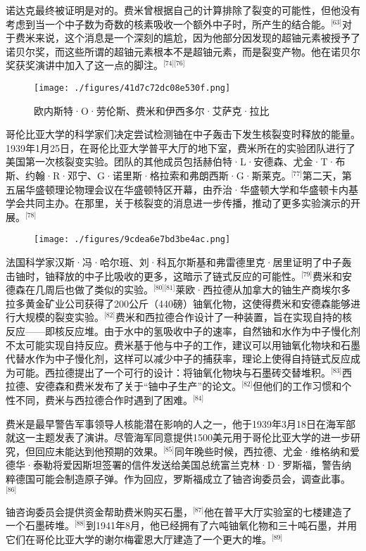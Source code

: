 诺达克最终被证明是对的。费米曾根据自己的计算排除了裂变的可能性，但他没有考虑到当一个中子数为奇数的核素吸收一个额外中子时，所产生的结合能。\(^\text{[63]}\)对于费米来说，这个消息是一个深刻的尴尬，因为他部分因发现的超铀元素被授予了诺贝尔奖，而这些所谓的超铀元素根本不是超铀元素，而是裂变产物。他在诺贝尔奖获奖演讲中加入了这一点的脚注。\(^\text{[74][76]}\)
\begin{figure}[ht]
\centering
\texttt{[image: ./figures/41d7c72dc08e530f.png]}
\caption{欧内斯特·O·劳伦斯、费米和伊西多尔·艾萨克·拉比} \label{fig_ELK_9}
\end{figure}
哥伦比亚大学的科学家们决定尝试检测铀在中子轰击下发生核裂变时释放的能量。1939年1月25日，在哥伦比亚大学普平大厅的地下室，费米所在的实验团队进行了美国第一次核裂变实验。团队的其他成员包括赫伯特·L·安德森、尤金·T·布斯、约翰·R·邓宁、G·诺里斯·格拉索和弗朗西斯·G·斯莱克。\(^\text{[77]}\)第二天，第五届华盛顿理论物理会议在华盛顿特区开幕，由乔治·华盛顿大学和华盛顿卡内基学会共同主办。在那里，关于核裂变的消息进一步传播，推动了更多实验演示的开展。\(^\text{[78]}\)
\begin{figure}[ht]
\centering
\texttt{[image: ./figures/9cdea6e7bd3be4ac.png]}
\caption{} \label{fig_ELK_10}
\end{figure}
法国科学家汉斯·冯·哈尔班、刘·科瓦尔斯基和弗雷德里克·居里证明了中子轰击铀时，铀释放的中子比吸收的更多，这暗示了链式反应的可能性。\(^\text{[79]}\)费米和安德森在几周后也做了类似的实验。\(^\text{[80][81]}\)莱欧·西拉德从加拿大的铀生产商埃尔多拉多黄金矿业公司获得了200公斤（440磅）铀氧化物，这使得费米和安德森能够进行大规模的裂变实验。\(^\text{[82]}\)费米和西拉德合作设计了一种装置，旨在实现自持的核反应——即核反应堆。由于水中的氢吸收中子的速率，自然铀和水作为中子慢化剂不太可能实现自持反应。费米基于他与中子的工作，建议可以用铀氧化物块和石墨代替水作为中子慢化剂，这样可以减少中子的捕获率，理论上使得自持链式反应成为可能。西拉德提出了一个可行的设计：将铀氧化物块与石墨砖交替堆积。\(^\text{[83]}\)西拉德、安德森和费米发布了关于“铀中子生产”的论文。\(^\text{[82]}\)但他们的工作习惯和个性不同，费米与西拉德合作时遇到了困难。\(^\text{[84]}\)

费米是最早警告军事领导人核能潜在影响的人之一，他于1939年3月18日在海军部就这一主题发表了演讲。尽管海军同意提供1500美元用于哥伦比亚大学的进一步研究，但回应未能达到他预期的效果。\(^\text{[85]}\)同年晚些时候，西拉德、尤金·维格纳和爱德华·泰勒将爱因斯坦签署的信件发送给美国总统富兰克林·D·罗斯福，警告纳粹德国可能会制造原子弹。作为回应，罗斯福成立了铀咨询委员会，调查此事。\(^\text{[86]}\)

铀咨询委员会提供资金帮助费米购买石墨，\(^\text{[87]}\)他在普平大厅实验室的七楼建造了一个石墨砖堆。\(^\text{[88]}\)到1941年8月，他已经拥有了六吨铀氧化物和三十吨石墨，并用它们在哥伦比亚大学的谢尔梅霍恩大厅建造了一个更大的堆。\(^\text{[89]}\)

